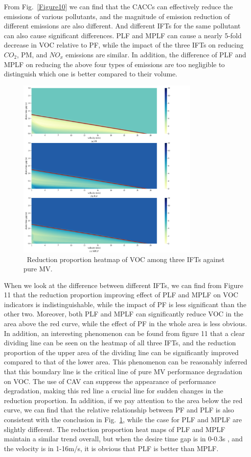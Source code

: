 \documentclass[journal]{IEEEtran}
\begin{document}
From Fig.~\ref{Figure10} we can find that the CACCs can effectively reduce the emissions of various pollutants, and the magnitude of emission reduction of different emissions are also different. And different IFTs for the same pollutant can also cause significant differences. PLF and MPLF can cause a nearly 5-fold decrease in VOC relative to PF, while the impact of the three IFTs on reducing $CO_2$, PM, and $NO_x$ emissions are similar. In addition, the difference of PLF and MPLF on reducing the above four types of emissions are too negligible to distinguish which one is better compared to their volume.
\begin{figure}
\includegraphics[width=9cm]{fig11.png}
\caption{~Reduction proportion heatmap of VOC among three IFTs against pure MV.} 
\label{Figure11}
\end{figure}

When we look at the difference between different IFTs, we can find from Figure 11 that the reduction proportion improving effect of PLF and MPLF on VOC indicators is indistinguishable, while the impact of PF is less significant than the other two. Moreover, both PLF and MPLF can significantly reduce VOC in the area above the red curve, while the effect of PF in the whole area is less obvious. In addition, an interesting phenomenon can be found from figure 11 that a clear dividing line can be seen on the heatmap of all three IFTs, and the reduction proportion of the upper area of the dividing line can be significantly improved compared to that of the lower area. This phenomenon can be reasonably inferred that this boundary line is the critical line of pure MV performance degradation on VOC. The use of CAV can suppress the appearance of performance degradation, making this red line a crucial line for sudden changes in the reduction proportion. In addition, if we pay attention to the area below the red curve, we can find that the relative relationship between PF and PLF is also consistent with the conclusion in Fig.~\ref{Figure11}, while the case for PLF and MPLF are slightly different. The reduction proportion heat maps of PLF and MPLF maintain a similar trend overall, but when the desire time gap is in 0-0.3s , and the velocity is in 1-16m/s, it is obvious that PLF is better than MPLF.
\end{document}
